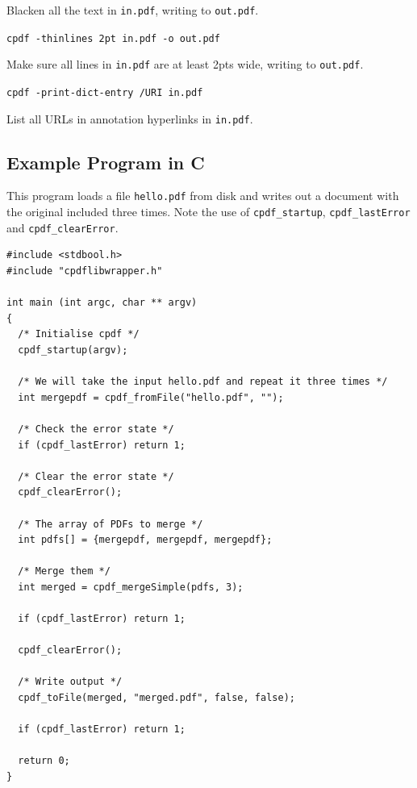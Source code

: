 \documentclass{book}
\begin{document}
\noindent Blacken all the text in \texttt{in.pdf}, writing to \texttt{out.pdf}.

\begin{framed}\noindent\texttt{cpdf -thinlines 2pt in.pdf -o out.pdf}\end{framed}

\noindent Make sure all lines in \texttt{in.pdf} are at least 2pts wide, writing to \texttt{out.pdf}.


\begin{framed}\noindent\texttt{cpdf -print-dict-entry /URI in.pdf}\end{framed}

\noindent List all URLs in annotation hyperlinks in \texttt{in.pdf}.

\pagestyle{empty}\thispagestyle{plain}
\cleardoublepage

\begin{cpdflib}
\chapter*{Example Program in C}

This program loads a file \texttt{hello.pdf} from disk and writes out a document with the original included three times. Note the use of \texttt{cpdf\_startup}, \texttt{cpdf\_lastError} and \texttt{cpdf\_clearError}.

\begin{small}
\begin{verbatim}
#include <stdbool.h>
#include "cpdflibwrapper.h"

int main (int argc, char ** argv)
{
  /* Initialise cpdf */
  cpdf_startup(argv);

  /* We will take the input hello.pdf and repeat it three times */
  int mergepdf = cpdf_fromFile("hello.pdf", "");

  /* Check the error state */
  if (cpdf_lastError) return 1;

  /* Clear the error state */
  cpdf_clearError();

  /* The array of PDFs to merge */
  int pdfs[] = {mergepdf, mergepdf, mergepdf};

  /* Merge them */
  int merged = cpdf_mergeSimple(pdfs, 3);
  
  if (cpdf_lastError) return 1;

  cpdf_clearError();

  /* Write output */
  cpdf_toFile(merged, "merged.pdf", false, false);

  if (cpdf_lastError) return 1;

  return 0;
}
\end{verbatim}
\end{small}
\end{cpdflib}
\end{document}

